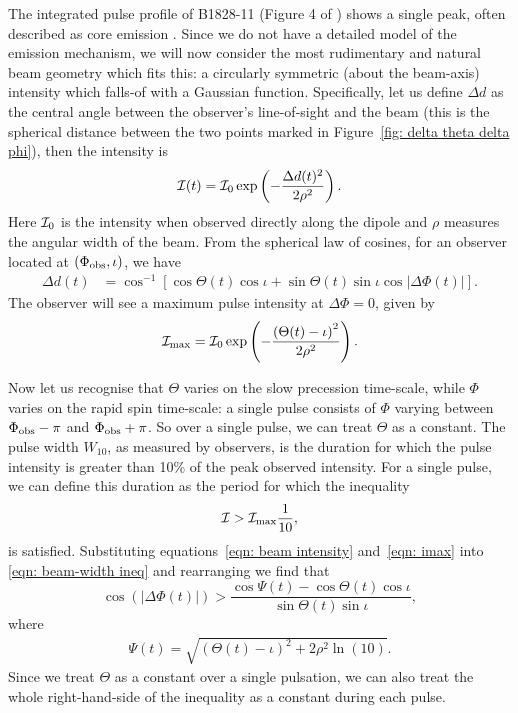 \documentclass[../full_thesis/full_thesis.tex]{subfiles}
\begin{document}
The integrated pulse profile of B1828-11 (Figure 4 of \citet{Lyne2010})
shows a single peak, often described as  core emission \mbox{\citep{Lyne1988}}.  Since
we do not have a detailed model of the emission mechanism, we will now consider
the most rudimentary and natural beam geometry which fits this: a circularly
symmetric (about the beam-axis) intensity which falls-of with a Gaussian
function.  Specifically, let us define $\Delta d$ as the central angle between
the observer's line-of-sight and the beam (this is the spherical distance
between the two points marked in Figure~\ref{fig: delta theta delta phi}), then
the intensity is
\begin{equation}
\mathcal{I}(t) = \mathcal{I}_{0}\exp\left(-\frac{\Delta d(t)^{2}}{2\rho^{2}}\right).
\label{eqn: beam intensity}
\end{equation}
Here $\mathcal{I}_0$ is the intensity when observed directly along the dipole and
$\rho$ measures the angular width of the beam.
From the spherical law of cosines, for an observer located at $(\Phi_{\mathrm{obs}}, \iota)$,
we have
\begin{align}
\Delta d(t) &= \cos^{-1}\left[\cos\Theta(t)\cos\iota +
                              \sin\Theta(t)\sin\iota\cos|\Delta\Phi(t)|\right].
\label{eqn: angular sep}
\end{align}
The observer will see a maximum pulse intensity at $\Delta\Phi = 0$, given by
\begin{align}
\mathcal{I}_\textrm{max} = \mathcal{I}_{0} \exp\left(
    -\frac{\left(\Theta(t) - \iota\right)^{2}}
          {2\rho^{2}}\right).
\label{eqn: imax}
\end{align}

Now let us recognise that $\Theta$ varies on the slow precession time-scale,
while $\Phi$ varies on the rapid spin time-scale: a single pulse consists of
$\Phi$ varying between $\Phi_{\mathrm{obs}} - \pi$ and $\Phi_{\mathrm{obs}} + \pi$. So over a single pulse,
we can treat $\Theta$ as a constant. The pulse width $W_{10}$, as measured by
observers, is the duration for which the pulse intensity is greater than 10\%
of the peak observed intensity. For a single pulse, we can define this duration
as the period for which the inequality
\begin{align}
\mathcal{I} > \mathcal{I}_{\textrm{max}} \frac{1}{10},
\label{eqn: beam-width ineq}
\end{align}
is satisfied.  Substituting equations~\eqref{eqn: beam intensity}
and~\eqref{eqn: imax} into \eqref{eqn: beam-width ineq} and rearranging we find
that
\begin{equation}
\cos(|\Delta\Phi(t)|) > \frac{\cos\Psi(t)-\cos\Theta(t)\cos\iota}
    {\sin\Theta(t)\sin\iota},
\label{eqn: cos delta phi}
\end{equation}
where
\begin{align}
\Psi(t) = \sqrt{
    \left(\Theta(t) - \iota\right)^{2} +
     2\rho^{2} \ln\left(10\right)}.
\label{eqn: Psi}
\end{align}
Since we treat $\Theta$ as a constant over a single pulsation, we can also treat
the whole right-hand-side of the inequality as a constant during each pulse.
\end{document}
